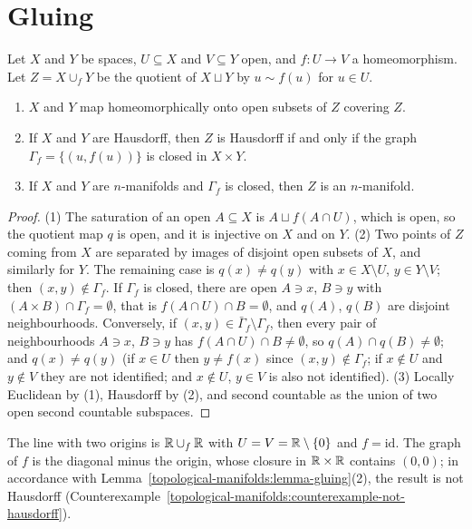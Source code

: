 \section{Gluing}\label{topological-manifolds:section-gluing}

\begin{lemma}\label{topological-manifolds:lemma-gluing}
Let $X$ and $Y$ be spaces, $U \subseteq X$ and $V \subseteq Y$ open, and $f \colon U \to V$ a homeomorphism. Let $Z = X \cup_fY$ be the quotient of $X \sqcup Y$ by $u \sim f(u)$ for $u \in U$.
\begin{enumerate}
\item $X$ and $Y$ map homeomorphically onto open subsets of $Z$ covering $Z$.
\item If $X$ and $Y$ are Hausdorff, then $Z$ is Hausdorff if and only if the graph $\Gamma_f = \{(u, f(u))\}$ is closed in $X \times Y$.
\item If $X$ and $Y$ are $n$-manifolds and $\Gamma_f$ is closed, then $Z$ is an $n$-manifold.
\end{enumerate}
\end{lemma}

\begin{proof}
(1) The saturation of an open $A \subseteq X$ is $A \sqcup f(A \cap U)$, which is open, so the quotient map $q$ is open, and it is injective on $X$ and on $Y$. (2) Two points of $Z$ coming from $X$ are separated by images of
disjoint open subsets of $X$, and similarly for $Y$. The remaining case is $q(x) \neq q(y)$ with $x \in X \setminus U$, $y \in Y \setminus V$; then $(x, y) \notin \Gamma_f$. If $\Gamma_f$ is closed, there are open $A \ni x$, $B \ni y$ with
$(A \times B) \cap \Gamma_f = \emptyset$, that is $f(A \cap U) \cap B = \emptyset$, and $q(A)$, $q(B)$ are disjoint neighbourhoods. Conversely, if $(x, y) \in \bar\Gamma_f \setminus \Gamma_f$, then every pair of neighbourhoods $A \ni x$,
$B \ni y$ has $f(A \cap U) \cap B \neq \emptyset$, so $q(A) \cap q(B) \neq \emptyset$; and $q(x) \neq q(y)$ (if $x \in U$ then $y \neq f(x)$ since $(x, y) \notin \Gamma_f$; if $x \notin U$ and $y \notin V$ they are not identified; and $x \notin U$,
$y \in V$ is also not identified). (3) Locally Euclidean by (1), Hausdorff by (2), and second countable as the union of two open second countable subspaces.
\end{proof}

\begin{counterexample}\label{topological-manifolds:counterexample-gluing}
The line with two origins is $\mathbb{R} \cup_f\mathbb{R}$ with $U = V = \mathbb{R} \setminus \{0\}$ and $f = \mathrm{id}$. The graph of $f$ is the diagonal minus the origin, whose closure in $\mathbb{R} \times \mathbb{R}$ contains $(0, 0)$; in accordance with
Lemma~\ref{topological-manifolds:lemma-gluing}(2), the result is not Hausdorff (Counterexample~\ref{topological-manifolds:counterexample-not-hausdorff}).
\end{counterexample}

